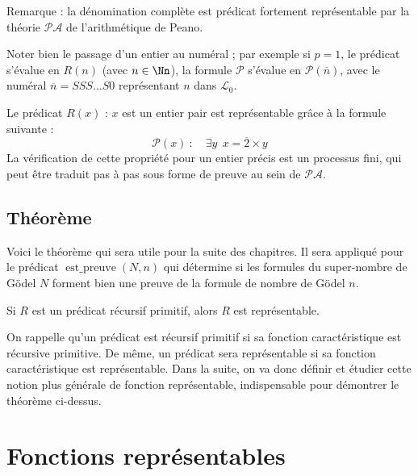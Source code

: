 \documentclass[11pt,class=report,crop=false]{standalone}
\begin{document}
Remarque : la dénomination complète est \og{}prédicat fortement représentable par la théorie $\mathcal{PA}$ de l'arithmétique de Peano\fg{}.

Noter bien le passage d'un entier au numéral ; par exemple si $p=1$, le prédicat s'évalue en $R(n)$ (avec $n \in \Nn$), la formule $\mathcal{P}$ s'évalue en $\mathcal{P}(\overline{n})$, avec le numéral $\overline{n} = SSS \ldots S0$ représentant $n$ dans $\mathcal{L}_0$.

\begin{exemple}
    Le prédicat $R(x)$ : \og{}$x$ est un entier pair\fg{} est représentable grâce à la formule suivante :
    \[ \mathcal{P}(x) \ : \quad \exists y \ \ x = \overline{2} \times y \]
    La vérification de cette propriété pour un entier précis est un processus fini, qui peut être traduit pas à pas sous forme de preuve au sein de $\mathcal{PA}$.
\end{exemple}

\subsection{Théorème}

Voici le théorème qui sera utile pour la suite des chapitres. Il sera appliqué pour le prédicat \og{}$\operatorname{est\_preuve}(N, n)$\fg{} qui détermine si les formules du super-nombre de Gödel $N$ forment bien une preuve de la formule de nombre de Gödel $n$.

\begin{theoreme}
    \label{thm:predicat-representable}
    Si $R$ est un prédicat récursif primitif, alors $R$ est représentable.
\end{theoreme}

On rappelle qu'un prédicat est récursif primitif si sa fonction caractéristique est récursive primitive. 
De même, un prédicat sera représentable si sa fonction caractéristique est représentable. Dans la suite, on va donc définir et étudier cette notion plus générale de fonction représentable, indispensable pour démontrer le théorème ci-dessus.


\section{Fonctions représentables} 

\end{document}
